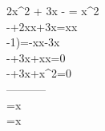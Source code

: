 2x^2 + 3x - = x^2\\
-+2\cdot x\cdot x+3\cdot x=x\cdot x\\
-1)\cdot {}=-x\cdot x-3\cdot x\\
-+3\cdot x+x\cdot x=0\\
-+3\cdot x+x^2=0\\
-----------\\
=x\\
=x
